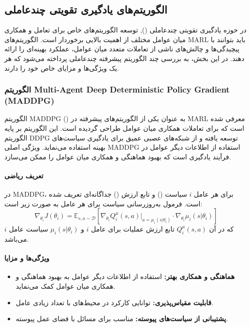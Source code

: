 \subsection{الگوریتم‌های یادگیری تقویتی چندعاملی}

در حوزه یادگیری تقویتی چندعاملی (), توسعه الگوریتم‌های خاص برای تعامل و همکاری میان عوامل مختلف از اهمیت بالایی برخوردار است. الگوریتم‌های MARL باید بتوانند با پیچیدگی‌ها و چالش‌های ناشی از تعاملات متعدد میان عوامل، عملکرد بهینه‌ای را ارائه دهند. در این بخش، به بررسی چند الگوریتم پیشرفته چندعاملی پرداخته می‌شود که هر یک ویژگی‌ها و مزایای خاص خود را دارند.

\subsubsection{الگوریتم Multi-Agent Deep Deterministic Policy Gradient (MADDPG)}

الگوریتم MADDPG () به عنوان یکی از الگوریتم‌های پیشرفته در MARL معرفی شده است که برای تعاملات همکاری میان عوامل طراحی گردیده است. این الگوریتم بر پایه الگوریتم DDPG توسعه یافته و از شبکه‌های عصبی عمیق برای یادگیری سیاست‌های بهینه استفاده می‌نماید. ویژگی اصلی MADDPG استفاده از اطلاعات دیگر عوامل در فرآیند یادگیری است که بهبود هماهنگی و همکاری میان عوامل را ممکن می‌سازد.

\paragraph{تعریف ریاضی}
در MADDPG، برای هر عامل \( i \) سیاست () و تابع ارزش () جداگانه‌ای تعریف شده است. فرمول به‌روزرسانی سیاست برای هر عامل به صورت زیر است:
\[
\nabla_{\theta_i} J(\theta_i) = \mathbb{E}_{s,a \sim \mathcal{D}} \left[ \nabla_{\theta_i} Q_i^{\mu}(s,a) \big|_{a=\mu_i(s|\theta_i)} \cdot \nabla_{\theta_i} \mu_i(s|\theta_i) \right]
\]
که در آن \( Q_i^{\mu}(s,a) \) تابع ارزش عملیات برای عامل \( i \) و \( \mu_i(s|\theta_i) \) سیاست عامل \( i \) می‌باشد.

\paragraph{ویژگی‌ها و مزایا}
\begin{itemize}
	\item \textbf{هماهنگی و همکاری بهتر:} استفاده از اطلاعات دیگر عوامل به بهبود هماهنگی و همکاری میان عوامل کمک می‌نماید.
	\item \textbf{قابلیت مقیاس‌پذیری:} توانایی کارکرد در محیط‌های با تعداد زیادی عامل.
	\item \textbf{پشتیبانی از سیاست‌های پیوسته:} مناسب برای مسائل با فضای عمل پیوسته.
\end{itemize}

